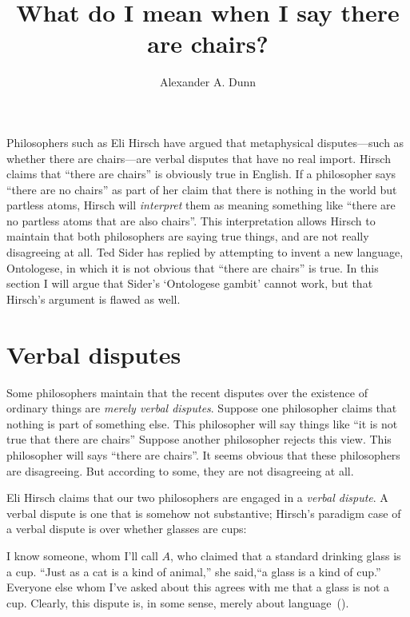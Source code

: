 \documentclass[11pt]{article}
\title{What do I mean when I say there are chairs?}
\author{Alexander A. Dunn}
\newenvironment{squote}{%
\begin{spacing}{1}
       	\begin{list}{}{%
\setlength{\labelwidth}{0pt}%
\rightmargin\leftmargin%
}
\item\relax
}{%
\end{list}%
\end{spacing}
}
\begin{document}
\ifstandalone
\maketitle
\begin{spacing}{1.25}
\fi

\label{verbal}
Philosophers such as Eli Hirsch have argued that metaphysical
disputes---such as whether there are chairs---are verbal disputes that
have no real import.  Hirsch claims that ``there are chairs'' is
obviously true in English.  If a philosopher says ``there are no
chairs'' as part of her claim that there is nothing in the world but
partless atoms, Hirsch will {\em interpret} them as meaning something
like ``there are no partless atoms that are also chairs''.  This
interpretation allows Hirsch to maintain that both philosophers are
saying true things, and are not really disagreeing at all.  Ted Sider
has replied by attempting to invent a new language, Ontologese, in
which it is not obvious that ``there are chairs'' is true.  In this
section I will argue that Sider's `Ontologese gambit' cannot work, but
that Hirsch's argument is flawed as well.

\section{Verbal disputes}
\label{hirsch}
Some philosophers maintain that the recent disputes over the existence
of ordinary things are {\em merely verbal disputes}.  Suppose one
philosopher claims that nothing is part of something else.  This
philosopher will say things like ``it is not true that there are
chairs'' Suppose another philosopher rejects this view.  This
philosopher will says ``there are chairs''.  It seems obvious that
these philosophers are disagreeing.  But according to some, they are
not disagreeing at all.  

Eli Hirsch claims that our two philosophers are engaged in a {\em
  verbal dispute}.  A verbal dispute is one that is somehow not
substantive; Hirsch's paradigm case of a verbal dispute is over
whether glasses are cups:

\begin{squote}
  I know someone, whom I'll call $A$, who claimed that a standard
  drinking glass is a cup.  ``Just as a cat is a kind of animal,'' she
  said,``a glass is a kind of cup.''  Everyone else whom I've asked
  about this agrees with me that a glass is not a cup.  Clearly, this
  dispute is, in some sense, merely about
  language~(\citeyear[69]{hirsch2005}).
\end{squote}


\end{spacing}
\end{document}
